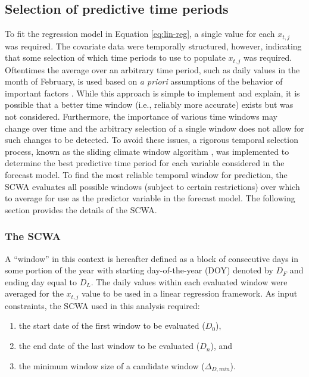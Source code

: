 \documentclass[12pt,]{book}
\providecommand{\tightlist}{%
  \setlength{\itemsep}{0pt}\setlength{\parskip}{0pt}}
\theoremstyle{definition}
\theoremstyle{definition}
\theoremstyle{definition}
\theoremstyle{remark}
\begin{document}
\subsection{Selection of predictive time periods}\label{clim-windows}

\noindent
To fit the regression model in Equation \eqref{eq:lin-reg}, a single value
for each \(x_{t,j}\) was required. The covariate data were temporally
structured, however, indicating that some selection of which time
periods to use to populate \(x_{t,j}\) was required. Oftentimes the
average over an arbitrary time period, such as daily values in the month
of February, is used based on \emph{a priori} assumptions of the
behavior of important factors \citep{vandepol-etal-2016}. While this
approach is simple to implement and explain, it is possible that a
better time window (i.e., reliably more accurate) exists but was not
considered. Furthermore, the importance of various time windows may
change over time and the arbitrary selection of a single window does not
allow for such changes to be detected. To avoid these issues, a rigorous
temporal selection process, known as the sliding climate window
algorithm \citep[SCWA;][]{vandepol-etal-2016}, was implemented to
determine the best predictive time period for each variable considered
in the forecast model. To find the most reliable temporal window for
prediction, the SCWA evaluates all possible windows (subject to certain
restrictions) over which to average for use as the predictor variable in
the forecast model. The following section provides the details of the
SCWA.

\subsubsection{The SCWA}\label{the-scwa}

\noindent
A ``window'' in this context is hereafter defined as a block of
consecutive days in some portion of the year with starting
day-of-the-year (DOY) denoted by \(D_F\) and ending day equal to
\(D_L\). The daily values within each evaluated window were averaged for
the \(x_{t,j}\) value to be used in a linear regression framework. As
input constraints, the SCWA used in this analysis required:

\begin{enumerate}
\def\labelenumi{(\arabic{enumi})}
\tightlist
\item
  the start date of the first window to be evaluated (\(D_0\)),
\item
  the end date of the last window to be evaluated (\(D_n\)), and
\item
  the minimum window size of a candidate window (\(\Delta_{D,min}\)).
\end{enumerate}
\end{document}
